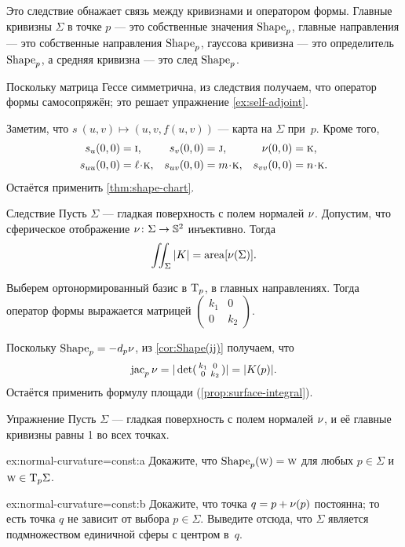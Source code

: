 Это следствие обнажает связь между кривизнами и оператором формы.
Главные кривизны $\Sigma$ в точке $p$ --- это собственные значения $\mathop{\rm Shape}\nolimits_p$, главные направления --- это собственные направления $\mathop{\rm Shape}\nolimits_p$, гауссова кривизна --- это определитель $\mathop{\rm Shape}\nolimits_p$, а средняя кривизна --- это след $\mathop{\rm Shape}\nolimits_p$.

Поскольку матрица Гессе симметрична, из следствия получаем, что оператор формы самосопряжён;
это решает упражнение \ref{ex:self-adjoint}.

Заметим, что $s\:(u,v)\mapsto (u,v,f(u,v))$ --- карта на $\Sigma$ при~$p$.
Кроме того, 
\begin{align*}
s_u(0,0)&=\vec i,
&
s_v(0,0)&=\vec j,
&
\Norm(0,0)&=\vec k,
\\
s_{uu}(0,0)&=\ell\cdot \vec k,
&
s_{uv}(0,0)&=m\cdot \vec k,
&
s_{vv}(0,0)&=n\cdot \vec k.
\end{align*}
Остаётся применить \ref{thm:shape-chart}.
\qeds


\begin{thm}{Следствие}\label{cor:intK}
Пусть $\Sigma$ --- гладкая поверхность с полем нормалей $\nu$.
Допустим, что сферическое отображение $\nu\colon\Sigma\to\mathbb{S}^2$ инъективно.
Тогда 
\[\iint_\Sigma|K|=\mathop{\rm area}\nolimits[\nu(\Sigma)].\]
\end{thm}

{\sloppy

Выберем ортонормированный базис в $\mathrm{T}_p$, в главных направлениях.
Тогда оператор формы выражается матрицей 
$(\begin{smallmatrix}
 k_1
 &0
 \\
 0
 &k_2
\end{smallmatrix})$.

}

Поскольку $\mathop{\rm Shape}\nolimits_p=-d_p\nu$, из \ref{cor:Shape(ij)} получаем, что
\[\mathop{\rm jac}\nolimits_p\nu=|\det(\begin{smallmatrix}
 k_1
 &0
 \\
 0
 &k_2
 \end{smallmatrix})|=|K(p)|.\]
Остаётся применить формулу площади (\ref{prop:surface-integral}).
\qeds



\begin{thm}{Упражнение}\label{ex:normal-curvature=const}
Пусть $\Sigma$ --- гладкая поверхность с полем нормалей $\nu$, и её главные кривизны  равны 1 во всех точках.

\begin{subthm}{ex:normal-curvature=const:a}
Докажите, что $\mathop{\rm Shape}\nolimits_p(\text{\sc{w}})=\text{\sc{w}}$ для любых $p\in\Sigma$ и $\text{\sc{w}}\in \mathrm{T}_p\Sigma$.
\end{subthm}

\begin{subthm}{ex:normal-curvature=const:b}
Докажите, что точка $q\z= p+\Norm(p)$ постоянна; то есть точка $q$ не зависит от выбора $p\in\Sigma$.
Выведите отсюда, что $\Sigma$ является подмножеством единичной сферы с центром в~$q$.
\end{subthm}

\end{thm}

